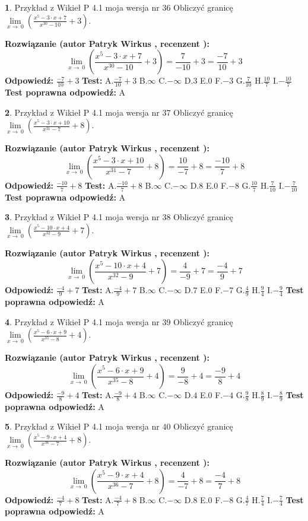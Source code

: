 \documentclass[12pt, a4paper]{article}
\theoremstyle{definition} %
\newtheorem{zad}{}
\newcommand{\zadStart}[1]{\begin{zad}#1\newline}
\newcommand{\zadStop}{\end{zad}}
\newcommand{\rozwStart}[2]{\noindent \textbf{Rozwiązanie (autor #1 , recenzent #2): }\newline}
\newcommand{\rozwStop}{\newline}
\newcommand{\odpStart}{\noindent \textbf{Odpowiedź:}\newline}
\newcommand{\odpStop}{\newline}
\newcommand{\testStart}{\noindent \textbf{Test:}\newline}
\newcommand{\testStop}{\newline}
\newcommand{\kluczStart}{\noindent \textbf{Test poprawna odpowiedź:}\newline}
\newcommand{\kluczStop}{\newline}
\begin{document}
\zadStart{Przykład z Wikieł P 4.1 moja wersja nr 36}
Obliczyć granicę $\lim\limits_{x\to\ 0}(\frac{x^{5}-3 \cdot x +7}{x^{30}-10}+3)$.
\zadStop
\rozwStart{Patryk Wirkus}{}
$$\lim\limits_{x\to\ 0}(\frac{x^{5}-3 \cdot x +7}{x^{30}-10}+3)=\frac{7}{-10}+3=\frac{-7}{10}+3$$
\rozwStop
\odpStart
$\frac{-7}{10}+3$
\odpStop
\testStart
A.$\frac{-7}{10}+3$
B.$\infty$
C.$-\infty$
D.$3$
E.$0$
F.$-3$
G.$\frac{7}{10}$
H.$\frac{10}{7}$
I.$-\frac{10}{7}$
\testStop
\kluczStart
A
\kluczStop



\zadStart{Przykład z Wikieł P 4.1 moja wersja nr 37}
Obliczyć granicę $\lim\limits_{x\to\ 0}(\frac{x^{5}-3 \cdot x +10}{x^{31}-7}+8)$.
\zadStop
\rozwStart{Patryk Wirkus}{}
$$\lim\limits_{x\to\ 0}(\frac{x^{5}-3 \cdot x +10}{x^{31}-7}+8)=\frac{10}{-7}+8=\frac{-10}{7}+8$$
\rozwStop
\odpStart
$\frac{-10}{7}+8$
\odpStop
\testStart
A.$\frac{-10}{7}+8$
B.$\infty$
C.$-\infty$
D.$8$
E.$0$
F.$-8$
G.$\frac{10}{7}$
H.$\frac{7}{10}$
I.$-\frac{7}{10}$
\testStop
\kluczStart
A
\kluczStop



\zadStart{Przykład z Wikieł P 4.1 moja wersja nr 38}
Obliczyć granicę $\lim\limits_{x\to\ 0}(\frac{x^{5}-10 \cdot x +4}{x^{32}-9}+7)$.
\zadStop
\rozwStart{Patryk Wirkus}{}
$$\lim\limits_{x\to\ 0}(\frac{x^{5}-10 \cdot x +4}{x^{32}-9}+7)=\frac{4}{-9}+7=\frac{-4}{9}+7$$
\rozwStop
\odpStart
$\frac{-4}{9}+7$
\odpStop
\testStart
A.$\frac{-4}{9}+7$
B.$\infty$
C.$-\infty$
D.$7$
E.$0$
F.$-7$
G.$\frac{4}{9}$
H.$\frac{9}{4}$
I.$-\frac{9}{4}$
\testStop
\kluczStart
A
\kluczStop



\zadStart{Przykład z Wikieł P 4.1 moja wersja nr 39}
Obliczyć granicę $\lim\limits_{x\to\ 0}(\frac{x^{5}-6 \cdot x +9}{x^{35}-8}+4)$.
\zadStop
\rozwStart{Patryk Wirkus}{}
$$\lim\limits_{x\to\ 0}(\frac{x^{5}-6 \cdot x +9}{x^{35}-8}+4)=\frac{9}{-8}+4=\frac{-9}{8}+4$$
\rozwStop
\odpStart
$\frac{-9}{8}+4$
\odpStop
\testStart
A.$\frac{-9}{8}+4$
B.$\infty$
C.$-\infty$
D.$4$
E.$0$
F.$-4$
G.$\frac{9}{8}$
H.$\frac{8}{9}$
I.$-\frac{8}{9}$
\testStop
\kluczStart
A
\kluczStop



\zadStart{Przykład z Wikieł P 4.1 moja wersja nr 40}
Obliczyć granicę $\lim\limits_{x\to\ 0}(\frac{x^{5}-9 \cdot x +4}{x^{36}-7}+8)$.
\zadStop
\rozwStart{Patryk Wirkus}{}
$$\lim\limits_{x\to\ 0}(\frac{x^{5}-9 \cdot x +4}{x^{36}-7}+8)=\frac{4}{-7}+8=\frac{-4}{7}+8$$
\rozwStop
\odpStart
$\frac{-4}{7}+8$
\odpStop
\testStart
A.$\frac{-4}{7}+8$
B.$\infty$
C.$-\infty$
D.$8$
E.$0$
F.$-8$
G.$\frac{4}{7}$
H.$\frac{7}{4}$
I.$-\frac{7}{4}$
\testStop
\kluczStart
A
\kluczStop
\end{document}
